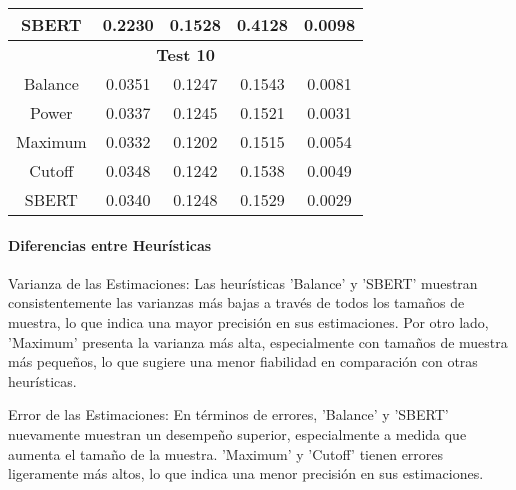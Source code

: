 \documentclass{article}
\begin{document}
\begin{table}[H]
{\begin{tabular}{|c|c|c|c|c|}
SBERT & 0.2230 & 0.1528 & 0.4128 & 0.0098 \\ \hline
\multicolumn{5}{|c|}{\textbf{Test 10}} \\ \hline
Balance & 0.0351 & 0.1247 & 0.1543 & 0.0081 \\ \hline
Power & 0.0337 & 0.1245 & 0.1521 & 0.0031 \\ \hline
Maximum & 0.0332 & 0.1202 & 0.1515 & 0.0054 \\ \hline
Cutoff & 0.0348 & 0.1242 & 0.1538 & 0.0049 \\ \hline
SBERT & 0.0340 & 0.1248 & 0.1529 & 0.0029 \\ \hline
\end{tabular}%
}
\end{table}

\begin{table}[H]
\centering
\caption{Analysis of the results per heuristic}
\label{table:heuristic_analysis}
\end{table}


\paragraph{Diferencias entre Heurísticas}
Varianza de las Estimaciones: Las heurísticas 'Balance' y 'SBERT' muestran consistentemente las varianzas más bajas a través de todos los tamaños de muestra, lo que indica una mayor precisión en sus estimaciones.
Por otro lado, 'Maximum' presenta la varianza más alta, especialmente con tamaños de muestra más pequeños, lo que sugiere una menor fiabilidad en comparación con otras heurísticas.

Error de las Estimaciones: En términos de errores, 'Balance' y 'SBERT' nuevamente muestran un desempeño superior, especialmente a medida que aumenta el tamaño de la muestra. 'Maximum' y 'Cutoff' tienen errores ligeramente más altos, lo que indica una menor precisión en sus estimaciones.
\end{document}
